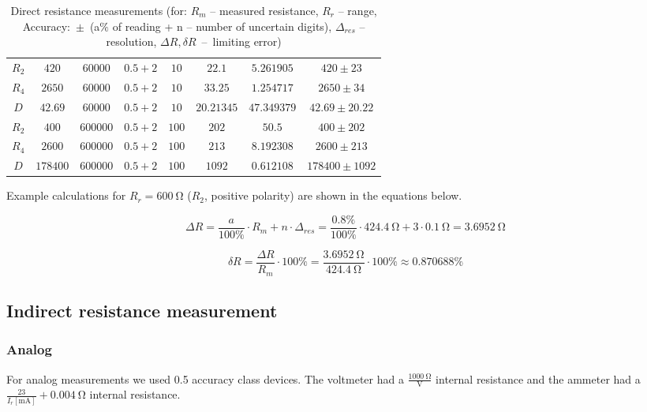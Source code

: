 \begin{table}[H]
\begin{tabular}{|  c | c | c | c | c | c | c | c |}
		\hline
		$R_2$ & $420$ & $60000$ & $0.5+2$ & $10$ & $22.1$ & $5.261905$ & $420 \pm 23$ \\
		$R_4$ & $2650$ & $60000$ & $0.5+2$ & $10$ & $33.25$ & $1.254717$ & $2650 \pm 34$ \\
		$D$ & $42.69$ & $60000$ & $0.5+2$ & $10$ & $20.21345$ & $47.349379$ & $42.69 \pm 20.22$ \\
		\hline
		$R_2$ & $400$ & $600000$ & $0.5+2$ & $100$ & $202$ & $50.5$ & $400 \pm 202$ \\
		$R_4$ & $2600$ & $600000$ & $0.5+2$ & $100$ & $213$ & $8.192308$ & $2600 \pm 213$ \\
		$D$ & $178400$ & $600000$ & $0.5+2$ & $100$ & $1092$ & $0.612108$ & $178400 \pm 1092$ \\
		\hline
	\end{tabular}
	\caption{Direct resistance measurements (for: $R_m$ -- measured resistance, $R_r$ -- range, Accuracy:~$\pm$~(a$\unit{\percent}$ of reading + n  -- number of uncertain digits), $\Delta_{res}$ -- resolution, $\Delta R, \delta R$~--~limiting error)}
	\label{tab:direct}
\end{table}

Example calculations for $R_r = \SI{600}{\ohm}$ ($R_2$, positive polarity) are shown in the equations below.

\begin{equation}
	\Delta R = \frac{a}{100\unit{\percent}}\cdot R_m + n\cdot \Delta_{res} = \frac{0.8\unit{\percent}}{100\unit{\percent}}\cdot\SI{424.4}{\ohm} + 3\cdot\SI{0.1}{\ohm} = \SI{3.6952}{\ohm}
\end{equation}

\begin{equation}
	\delta R = \frac{\Delta R}{R_m}\cdot 100\unit{\percent} = \frac{\SI{3.6952}{\ohm}}{\SI{424.4}{\ohm}}\cdot 100\unit{\percent}\approx 0.870688\unit{\percent}
\end{equation}

\subsection{Indirect resistance measurement}

\subsubsection{Analog}

For analog measurements we used 0.5 accuracy class devices. The voltmeter had a $\frac{\SI{1000}{\ohm}}{\unit{\volt}}$ internal resistance and the ammeter had a $\frac{23}{I_r[\unit{\milli\ampere}]} + \SI{0.004}{\ohm}$ internal resistance.

